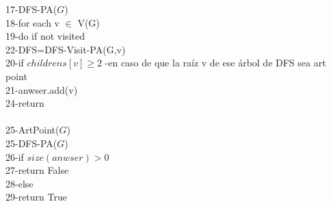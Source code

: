 \documentclass{article}
\begin{document}
\begin{algorithm}[H]
        17-\hspace*{1em}DFS-PA($G$)\\
        18-\hspace*{2em}for each v $\in$ V(G)\\
        19-\hspace*{3em}do if not visited\\
        22-\hspace*{4em}DFS=DFS-Visit-PA(G,v)\\
        20-\hspace*{4em}if $childrens[v] \ge 2$ -en caso de que la ra\'iz v de ese \'arbol de DFS sea art point \\
        21-\hspace*{5em}anwser.add(v)\\
        24-\hspace*{2em}return \\\\
        25-\hspace*{1em}ArtPoint($G$)\\
        25-\hspace*{2em}DFS-PA($G$)\\
        26-\hspace*{2em}if $size(anwser) >0$\\
        27-\hspace*{3em}return False\\
        28-\hspace*{2em}else\\
        29-\hspace*{3em}return True\\
        
        
    \end{algorithm}
\end{document}
